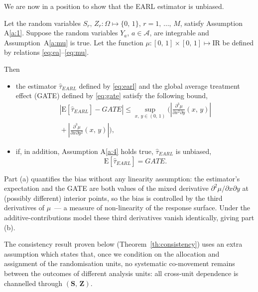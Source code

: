 \documentclass[sigconf,nonacm]{acmart}
\newcounter{assumption}
\newcommand{\E}{\mathrm E}
\newcommand{\R}{\mathrm{I}\!\mathrm{R}}
\newcommand{\nn}{\nonumber}
\begin{document}
We are now in a position to show that the EARL estimator is unbiased.
\begin{theorem}\label{th:unbiasedness}
    Let the random variables $S_r,\,Z_r\colon\Omega\mapsto\{0,\,1\}$, $r=1,\,\ldots,\,M$, satisfy Assumption A\ref{a:1}. Suppose the random variables $Y_a$, $a\in\mathcal A$, are integrable and Assumption~A\ref{a:mu} is true. Let the function $\mu\colon[0,\,1]\times[0,\,1]\mapsto\R$ be defined by relations \eqref{eq:ea}--\eqref{eq:mu}.

    Then
    \begin{itemize}
    \item[\textup{(a)}] the estimator $\hat\tau_{EARL}$ defined by \eqref{eq:earl} and the global average treatment effect (GATE) defined by \eqref{eq:gate} satisfy the following bound,
    \begin{eqnarray}\label{eq:bound}
        \left|\E[\hat\tau^{\phantom{1}}_{EARL}] - GATE\right| \le \sup_{x,\,y\in(0,\,1)}\Bigg(\left|\frac{\partial^3\mu}{\partial x^2\partial y}(x,\,y)\right| \nn\\ {}+ \left|\frac{\partial^3\mu}{\partial  x\partial y^2}(x,\,y)\right|\Bigg),
    \end{eqnarray}
    \item[\textup{(b)}] if, in addition, Assumption A\ref{a:4} holds true, $\hat \tau_{EARL}$ is unbiased,
    \begin{equation}\label{eq:unbiasedness}
        \E[\hat\tau^{\phantom{1}}_{EARL}] = GATE.
    \end{equation}
    \end{itemize}
\end{theorem}

Part (a) quantifies the bias without any linearity assumption: the estimator's expectation and the GATE are both values of the mixed derivative $\partial^2\mu/\partial x\partial y$ at (possibly different) interior points, so the bias is controlled by the third derivatives of $\mu$~--- a measure of non-linearity of the response surface. Under the additive-contributions model these third derivatives vanish identically, giving part (b).

The consistency result proven below (Theorem~\ref{th:consistency}) uses an extra assumption which states that, once we condition on the allocation and assignment of the randomisation units, no systematic co-movement remains between the outcomes of different analysis units: all cross-unit dependence is channelled through $(\mathbf S,\,\mathbf Z)$.
\end{document}
